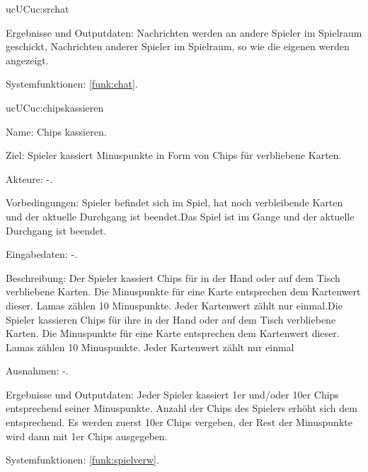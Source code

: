 \begin{description}[leftmargin=5em, style=sameline]
\begin{lhp}{uc}{UC}{uc:srchat}
		\item [Ergebnisse und Outputdaten:] Nachrichten werden an andere Spieler im Spielraum geschickt, Nachrichten anderer Spieler im Spielraum, so wie die eigenen werden angezeigt.	
		\item [Systemfunktionen:] \ref{funk:chat}. %
	\end{lhp}


	\begin{lhp}{uc}{UC}{uc:chipskassieren} 
		\item [Name:] Chips kassieren.
		\item [Ziel:] Spieler kassiert Minuspunkte in Form von Chips für verbliebene Karten.
		\item [Akteure:] -.
		\item [Vorbedingungen:]Spieler befindet sich im Spiel, hat noch verbleibende Karten und der aktuelle Durchgang ist beendet.Das Spiel ist im Gange und der aktuelle Durchgang ist beendet.
		\item [Eingabedaten:] -. 
		\item [Beschreibung:] Der Spieler kassiert Chips für in der Hand oder auf dem Tisch verbliebene Karten. Die Minuspunkte für eine Karte entsprechen dem Kartenwert dieser. Lamas zählen 10 Minuspunkte. Jeder Kartenwert zählt nur einmal.Die Spieler kassieren Chips für ihre in der Hand oder auf dem Tisch verbliebene Karten. Die Minuspunkte für eine Karte entsprechen dem Kartenwert dieser. Lamas zählen 10 Minuspunkte. Jeder Kartenwert zählt nur einmal
		\item [Ausnahmen:] -.
		\item [Ergebnisse und Outputdaten:] Jeder Spieler kassiert 1er und/oder 10er Chips entsprechend seiner Minuspunkte. Anzahl der Chips des Spielers erhöht sich dem entsprechend. Es werden zuerst 10er Chips vergeben, der Rest der Minuspunkte wird dann mit 1er Chips ausgegeben.
		\item [Systemfunktionen:] \ref{funk:spielverw}.
	\end{lhp}
	

\end{description}
